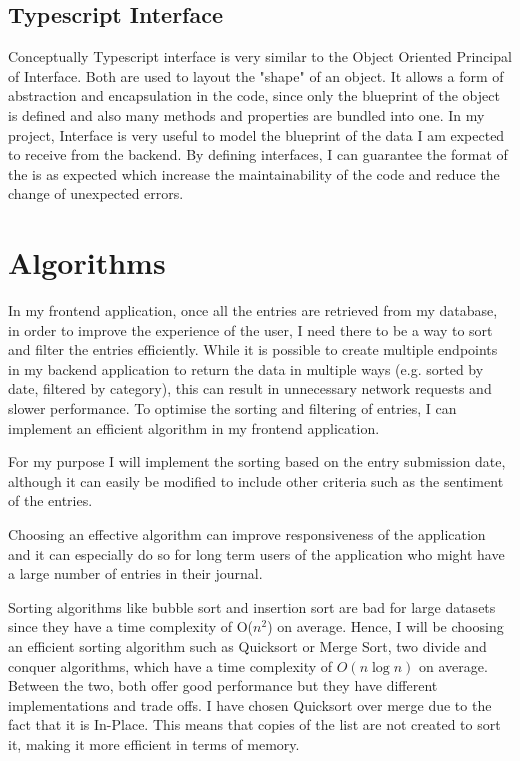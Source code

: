 \subsection{Typescript Interface}
Conceptually Typescript interface is very similar to the Object Oriented Principal of Interface. Both are used to layout the "shape" of an object. It allows a form of abstraction and encapsulation in the code, since only the blueprint of the object is defined and also many methods and properties are bundled into one. In my project, Interface is very useful to model the blueprint of the data I am expected to receive from the backend. By defining interfaces, I can guarantee the format of the is as expected which increase the maintainability of the code and reduce the change of unexpected errors.


\section{Algorithms}
In my frontend application, once all the entries are retrieved from my database, in order to improve the experience of the user, I need there to be a way to sort and filter the entries efficiently. While it is possible to create multiple endpoints in my backend application to return the data in multiple ways (e.g. sorted by date, filtered by category), this can result in unnecessary network requests and slower performance. To optimise the sorting and filtering of entries, I can implement an efficient algorithm in my frontend application.

For my purpose I will implement the sorting based on the entry submission date, although it can easily be modified to include other criteria such as the sentiment of the entries.

Choosing an effective algorithm can improve responsiveness of the application and it can especially do so for long term users of the application who might have a large number of entries in their journal.

Sorting algorithms like bubble sort and insertion sort are bad for large datasets since they have a time complexity of O(\(n^2\)) on average. Hence, I will be choosing an efficient sorting algorithm such as Quicksort or Merge Sort, two divide and conquer algorithms, which have a time complexity of $O(n\log{}n)$ on average. Between the two, both offer good performance but they have different implementations and trade offs. I have chosen Quicksort over merge due to the fact that it is In-Place. This means that copies of the list are not created to sort it, making it more efficient in terms of memory.

